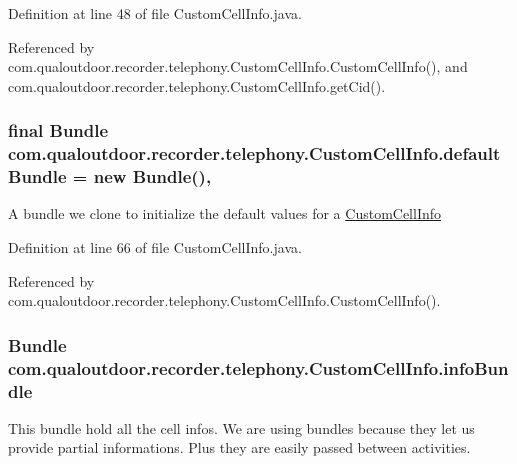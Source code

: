 Definition at line 48 of file Custom\-Cell\-Info.\-java.



Referenced by com.\-qualoutdoor.\-recorder.\-telephony.\-Custom\-Cell\-Info.\-Custom\-Cell\-Info(), and com.\-qualoutdoor.\-recorder.\-telephony.\-Custom\-Cell\-Info.\-get\-Cid().

\hypertarget{classcom_1_1qualoutdoor_1_1recorder_1_1telephony_1_1CustomCellInfo_a43d9dc5eb9e584f508a67fc2ace6c61c}{
\subsubsection[{default\-Bundle}]{\setlength{\rightskip}{0pt plus 5cm}final Bundle com.\-qualoutdoor.\-recorder.\-telephony.\-Custom\-Cell\-Info.\-default\-Bundle = new Bundle()\hspace{0.3cm}{\ttfamily [static]}, {\ttfamily [private]}}}\label{classcom_1_1qualoutdoor_1_1recorder_1_1telephony_1_1CustomCellInfo_a43d9dc5eb9e584f508a67fc2ace6c61c}
A bundle we clone to initialize the default values for a \hyperlink{classcom_1_1qualoutdoor_1_1recorder_1_1telephony_1_1CustomCellInfo}{Custom\-Cell\-Info} 

Definition at line 66 of file Custom\-Cell\-Info.\-java.



Referenced by com.\-qualoutdoor.\-recorder.\-telephony.\-Custom\-Cell\-Info.\-Custom\-Cell\-Info().

\hypertarget{classcom_1_1qualoutdoor_1_1recorder_1_1telephony_1_1CustomCellInfo_a8acfb6c3a7dfdb3dfbc27da18f49e77e}{
\subsubsection[{info\-Bundle}]{\setlength{\rightskip}{0pt plus 5cm}Bundle com.\-qualoutdoor.\-recorder.\-telephony.\-Custom\-Cell\-Info.\-info\-Bundle\hspace{0.3cm}{\ttfamily [private]}}}\label{classcom_1_1qualoutdoor_1_1recorder_1_1telephony_1_1CustomCellInfo_a8acfb6c3a7dfdb3dfbc27da18f49e77e}
This bundle hold all the cell infos. We are using bundles because they let us provide partial informations. Plus they are easily passed between activities. 

